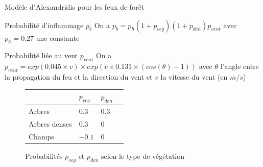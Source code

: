 \documentclass{beamer}
\begin{document}
\begin{frame}{Modèle d'Alexandridis pour les feux de forêt \hyperlink{jump}{\beamerbutton{ }} \hypertarget{8}{\beamerbutton{ }}}
    \begin{block}{Probabilité d'inflammage $p_b$}
        On a $p_b = p_h (1 + p_{veg}) (1 + p_{den}) p_{vent}$ avec $p_h = 0.27$ une constante
    \end{block}
    
    \begin{block}{Probabilité liée au vent $p_{vent}$}
        On a $p_{vent} = exp(0.045 \times v) \times exp (v \times 0.131 \times (cos(\theta) - 1))$ avec $\theta$ l'angle entre la propagation du feu et la direction du vent et $v$ la vitesse du vent (en $m/s$)
    \end{block}

    \begin{figure}
        \begin{center}
            \renewcommand{\arraystretch}{2}
            \setlength{\extrarowheight}{-3pt}
            \begin{table}
                \begin{tabular}{ |C{4cm}|L{2cm}|C{2cm}|N }
                \hline
                 & \centering $p_{veg}$ & $p_{den}$ \\
                \hline 
                Arbres & \centering $0.3$ & $0.3$ \\ 
                \hline
                Arbres denses & \centering $0.3$ & $0$ \\ 
                \hline
                Champs & \centering $-0.1$ & $0$ \\
                \hline 
                \end{tabular}
            \end{table}
        \end{center}
        \caption{Probabilités $p_{veg}$ et $p_{den}$ selon le type de végétation}
    \end{figure}
\end{frame}
\end{document}
